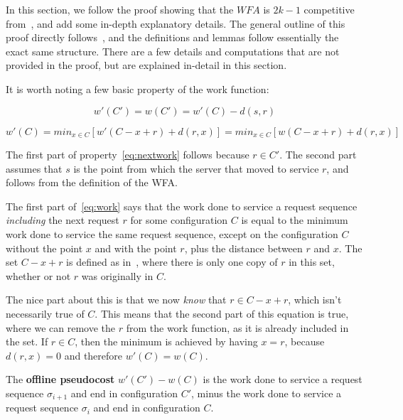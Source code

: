 In this section, we follow the proof showing that the $WFA$ is $2k-1$ competitive from~\cite{OnlineComp1998}, and add some in-depth explanatory details. The general outline of this proof directly follows~\cite{OnlineComp1998}, and the definitions and lemmas follow essentially the exact same structure. There are a few details and computations that are not provided in the proof, but are explained in-detail in this section.

It is worth noting a few basic property of the work function:

\begin{equation}
    \label{eq:nextwork}
    w'(C') = w(C') = w'(C) - d(s,r)
\end{equation}

\begin{equation}
    \label{eq:work}
    w'(C) = min_{x \in C} [w'(C - x + r) + d(r, x)] = min_{x \in C} [w(C - x + r) + d(r, x)]
\end{equation}

The first part of property~\ref{eq:nextwork} follows because $r \in C'$. The second part assumes that $s$ is the point from which the server that moved to service $r$, and follows from the definition of the WFA.

The first part of~\ref{eq:work} says that the work done to service a request sequence \textit{including} the next request $r$ for some configuration $C$ is equal to the minimum work done to service the same request sequence, except on the configuration $C$ without the point $x$ and with the point $r$, plus the distance between $r$ and $x$. The set $C-x+r$ is defined as in~\cite{OnlineComp1998}, where there is only one copy of $r$ in this set, whether or not $r$ was originally in $C$. 

The nice part about this is that we now \textit{know} that $r \in C - x + r$, which isn't necessarily true of $C$. This means that the second part of this equation is true, where we can remove the $r$ from the work function, as it is already included in the set. If $r \in C$, then the minimum is achieved by having $x = r$, because $d(r,x) = 0$ and therefore $w'(C) = w(C)$.

\begin{definition}
    The \textbf{offline pseudocost} $w'(C') - w(C)$ is the work done to service a request sequence $\sigma_{i+1}$ and end in configuration $C'$, minus the work done to service a request sequence $\sigma_i$ and end in configuration $C$.
\end{definition}

